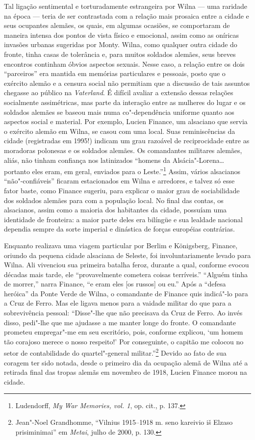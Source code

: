 Tal ligação sentimental e torturadamente estrangeira por Wilna --- uma
raridade na época --- teria de ser contrastada com a relação mais prosaica
entre a cidade e seus ocupantes alemães, os quais, em algumas ocasiões,
se comportaram de maneira intensa dos pontos de vista físico e
emocional, assim como as oníricas invasões urbanas sugeridas por Monty.
Wilna, como qualquer outra cidade do fronte, tinha casas de tolerância
e, para muitos soldados alemães, seus breves encontros continham óbvios
aspectos sexuais. Nesse caso, a relação entre os dois ``parceiros'' era
mantida em memórias particulares e pessoais, posto que o exército alemão
e a censura social não permitiam que a discussão de tais assuntos
chegasse ao público na \emph{Vaterland}. É difícil avaliar a extensão
dessas relações socialmente assimétricas, mas parte da interação entre
as mulheres do lugar e os soldados alemães se baseou mais numa
co"-dependência uniforme quanto aos aspectos social e material. Por
exemplo, Lucien Finance, um alsaciano que servia o exército alemão em
Wilna, se casou com uma local. Suas reminiscências da cidade
(registradas em 1995!) indicam um grau razoável de reciprocidade entre
as moradoras polonesas e os soldados alemães. Os comandantes militares
alemães, aliás, não tinham confiança nos latinizados ``homens da
Alsácia"-Lorena\ldots{} portanto eles eram, em geral, enviados para o
Leste.''\footnote{Ludendorff, \emph{My War Memories, vol. 1}, op. cit.,
  p. 137.} Assim, vários alsacianos ``não"-confiáveis'' ficaram
estacionados em Wilna e arredores, e talvez só esse fator baste, como
Finance sugeriu, para explicar o maior grau de sociabilidade dos
soldados alemães para com a população local. No final das contas, os
alsacianos, assim como a maioria dos habitantes da cidade, possuíam uma
identidade de fronteira: a maior parte deles era bilíngüe e sua lealdade
nacional dependia sempre da sorte imperial e dinástica de forças
européias contrárias.

%

Enquanto realizava uma viagem particular por Berlim e Königsberg,
Finance, oriundo da pequena cidade alsaciana de Seleste, foi
involuntariamente levado para Wilna. Ali vivenciou sua primeira batalha
feroz, durante a qual, conforme evocou décadas mais tarde, ele
``provavelmente cometera coisas terríveis.'' ``Alguém tinha de morrer,''
narra Finance, ``e eram eles {[}os russos{]} ou eu.'' Após a ``defesa
heróica'' da Ponte Verde de Wilna, o comandante de Finance quis
indicá"-lo para a Cruz de Ferro. Mas ele ligava menos para a vaidade
militar do que para a sobrevivência pessoal: ``Disse"-lhe que não
precisava da Cruz de Ferro. Ao invés disso, pedi"-lhe que me ajudasse a
me manter longe do fronte. O comandante prometeu empregar"-me em seu
escritório, pois, conforme explicou, `um homem tão corajoso merece o
nosso respeito!' Por conseguinte, o capitão me colocou no setor de
contabilidade do quartel"-general militar.''\footnote{Jean"-Noel
  Grandhomme, ``Vilnius 1915--1918 m. seno kareivio iš Elzaso
  prisiminimai'' em \emph{Metai}, julho de 2000, p. 130.} Devido ao fato
de sua coragem ter sido notada, desde o primeiro dia da ocupação alemã
de Wilna até a retirada final das tropas alemãs em novembro de 1918,
Lucien Finance morou na cidade.

